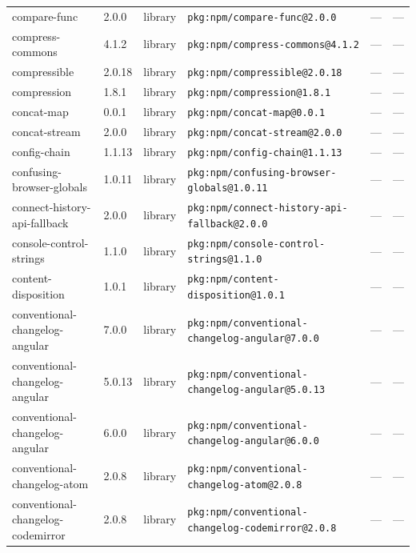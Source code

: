 \documentclass[11pt,a4paper]{article}
\begin{document}
\begin{longtable}{|p{4cm}|p{2cm}|p{1.6cm}|p{5cm}|p{1.5cm}|p{3.5cm}|}
\raggedright compare-func & 2.0.0 & library & \small\texttt{pkg:npm/compare-func@2.0.0} & — & \small — \\
\raggedright compress-commons & 4.1.2 & library & \small\texttt{pkg:npm/compress-commons@4.1.2} & — & \small — \\
\raggedright compressible & 2.0.18 & library & \small\texttt{pkg:npm/compressible@2.0.18} & — & \small — \\
\raggedright compression & 1.8.1 & library & \small\texttt{pkg:npm/compression@1.8.1} & — & \small — \\
\raggedright concat-map & 0.0.1 & library & \small\texttt{pkg:npm/concat-map@0.0.1} & — & \small — \\
\raggedright concat-stream & 2.0.0 & library & \small\texttt{pkg:npm/concat-stream@2.0.0} & — & \small — \\
\raggedright config-chain & 1.1.13 & library & \small\texttt{pkg:npm/config-chain@1.1.13} & — & \small — \\
\raggedright confusing-browser-globals & 1.0.11 & library & \small\texttt{pkg:npm/confusing-browser-globals@1.0.11} & — & \small — \\
\raggedright connect-history-api-fallback & 2.0.0 & library & \small\texttt{pkg:npm/connect-history-api-fallback@2.0.0} & — & \small — \\
\raggedright console-control-strings & 1.1.0 & library & \small\texttt{pkg:npm/console-control-strings@1.1.0} & — & \small — \\
\raggedright content-disposition & 1.0.1 & library & \small\texttt{pkg:npm/content-disposition@1.0.1} & — & \small — \\
\raggedright conventional-changelog-angular & 7.0.0 & library & \small\texttt{pkg:npm/conventional-changelog-angular@7.0.0} & — & \small — \\
\raggedright conventional-changelog-angular & 5.0.13 & library & \small\texttt{pkg:npm/conventional-changelog-angular@5.0.13} & — & \small — \\
\raggedright conventional-changelog-angular & 6.0.0 & library & \small\texttt{pkg:npm/conventional-changelog-angular@6.0.0} & — & \small — \\
\raggedright conventional-changelog-atom & 2.0.8 & library & \small\texttt{pkg:npm/conventional-changelog-atom@2.0.8} & — & \small — \\
\raggedright conventional-changelog-codemirror & 2.0.8 & library & \small\texttt{pkg:npm/conventional-changelog-codemirror@2.0.8} & — & \small — \\

\end{longtable}
\end{document}
